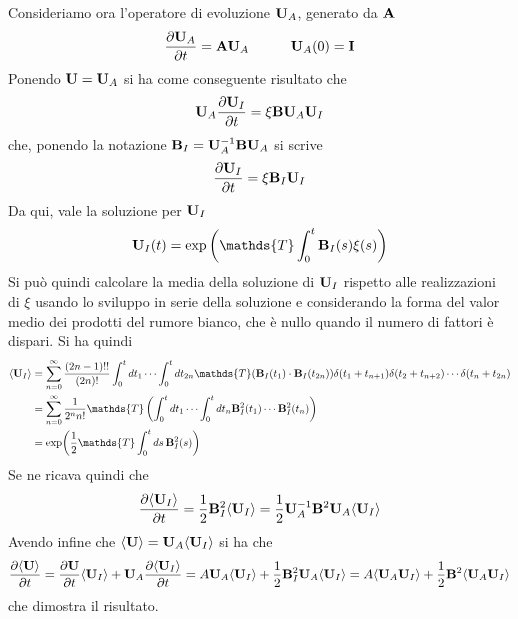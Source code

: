 \documentclass[10pt,a4paper]{article}
\begin{document}
Consideriamo ora l'operatore di evoluzione \(\vb{U}_{A}\), generato da \(\vb{A}\)
\begin{equation}
	\pdv{\vb{U}_A}{t} = \vb{A}\vb{U}_A \quad\quad\quad \vb{U}_A(0) = \vb{I}
\end{equation}
Ponendo \(\vb{U} = \vb{U}_A\) si ha come conseguente risultato che
\begin{equation}
	\vb{U}_{A} \pdv{\vb{U}_I}{t} = \xi \vb{B}\vb{U}_A \vb{U}_I
\end{equation}
che, ponendo la notazione \(\vb{B}_I = \vb{U}_A^{-1}\vb{B}\vb{U}_A\) si scrive
\begin{equation}
	\pdv{\vb{U}_I}{t} = \xi \vb{B}_I \vb{U}_I
\end{equation}
Da qui, vale la soluzione per \(\vb{U}_I\)
\begin{equation}
	\vb{U}_I(t) = \exp\left(\mathds{T}\int_0^t \vb{B}_I(s)\xi(s)\right)
\end{equation}
Si può quindi calcolare la media della soluzione di \(\vb{U}_I\) rispetto alle realizzazioni di \(\xi \) usando lo sviluppo in serie della soluzione e considerando la forma del valor medio dei prodotti del rumore bianco, che è nullo quando il numero di fattori è dispari. Si ha quindi
\begin{align}
	\langle\vb{U}_I\rangle &= \sum_{n=0}^\infty \frac{(2n-1)!!}{(2n)!}\int_0^t dt_1 \cdots \int_0^t dt_{2n} \mathds{T}(\vb{B}_I(t_1)\cdot\vb{B}_I(t_{2n})) \delta(t_1 + t_{n+1})\delta(t_2 + t_{n+2})\cdots\delta(t_n + t_{2n}) \\
	&= \sum_{n=0}^\infty \frac{1}{2^n n!} \mathds{T}\left(\int_0^t dt_1 \cdots \int_0^t dt_n \vb{B}_I^2(t_1)\cdots\vb{B}_I^2(t_n)\right) \\
	&= \exp(\frac{1}{2}\mathds{T}\int_0^t ds\, \vb{B}_I^2(s))
\end{align}
Se ne ricava quindi che
\begin{equation}
	\pdv{\langle\vb{U}_I\rangle}{t} = \frac{1}{2} \vb{B}_I^2\langle\vb{U}_I\rangle = \frac{1}{2} \vb{U}_A^{-1}\vb{B}^2\vb{U}_A\langle\vb{U}_I\rangle
\end{equation}
Avendo infine che \(\langle\vb{U}\rangle = \vb{U}_A\langle\vb{U}_I\rangle \) si ha che
\begin{equation}
	\pdv{\langle \vb{U}\rangle}{t} = \pdv{\vb{U}}{t}\langle\vb{U}_I\rangle + \vb{U}_A \pdv{\langle\vb{U}_I\rangle}{t} = A\vb{U}_A\langle\vb{U}_I\rangle + \frac{1}{2} \vb{B}^2_I\vb{U}_A\langle\vb{U}_I\rangle = A\langle\vb{U}_A\vb{U}_I\rangle + \frac{1}{2}\vb{B}^2\langle\vb{U}_A\vb{U}_I\rangle
\end{equation}
che dimostra il risultato.
\end{document}
